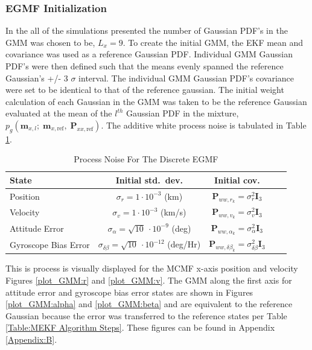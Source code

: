 \documentclass[conf]{new-aiaa}
\newcommand{\vect}[1]{\mathbf{#1}}
\newcommand{\mat}[1]{\mathbf{#1}}
\begin{document}
\subsubsection{EGMF Initialization}
In the all of the simulations presented the number of Gaussian PDF's in the GMM was chosen to be, $L_x = 9$. To create the initial GMM, the EKF mean and covariance was used as a reference Gaussian PDF. Individual GMM Gaussian PDF's were then defined such that the means evenly spanned the reference Gaussian's +/- 3 $\sigma$ interval. The individual GMM Gaussian PDF's covariance were set to be identical to that of the reference gaussian. The initial weight calculation of each Gaussian in the GMM was taken to be the reference Gaussian evaluated at the mean of the $l^{th}$ Gaussian PDF in the mixture, $p_g( \vect{m}_{x,l};\; \vect{m}_{x,{\text{ref}}},\; \mat{P}_{xx,\text{ref}} )$. The additive white process noise is tabulated in Table \ref{tab:EGMF_init_sigmas_psd}.

\begin{table}[h!]
\centering
\caption{Process Noise For The Discrete EGMF}
\label{tab:EGMF_init_sigmas_psd}
\begin{tabular}{l c c c c}
\hline
\textbf{State} & \textbf{Initial std.\ dev.} & \textbf{Initial cov.}  \\
\hline
Position & $\sigma_{r} = 1 \cdot10^{-3}$ (km) & $\mat{P}_{ww,r_k} = \sigma_{r}^{2}\mat{I}_3$ \\

Velocity & $\sigma_{v} = 1 \cdot10^{-3}$ (km/s) & $\mat{P}_{ww,v_k} = \sigma_{v}^{2}\mat{I}_3$  \\[6pt]

Attitude Error  & $\sigma_{\alpha} = \sqrt{10}\ \cdot10^{-9}$ (deg) & $\mat{P}_{ww,\alpha_k} = \sigma_{\alpha}^{2}\mat{I}_3$   \\[6pt]

Gyroscope Bias Error & $\sigma_{\delta\beta} = \sqrt{10}\ \cdot10^{-12}$ (deg/Hr) & $\mat{P}_{ww,\delta\beta_k} = \sigma_{\delta\beta}^{2}\mat{I}_3$  \\
\hline
\end{tabular}
\end{table}

This is process is visually displayed for the MCMF x-axis position and velocity Figures \ref{plot_GMM:r} and \ref{plot_GMM:v}. The GMM along the first axis for attitude error and gyroscope bias error states are shown in Figures \ref{plot_GMM:alpha} and \ref{plot_GMM:beta} and are equivalent to the reference Gaussian because the error was transferred to the reference states per Table \ref{Table:MEKF Algorithm Steps}. These figures can be found in Appendix \ref{Appendix:B}.
\end{document}
